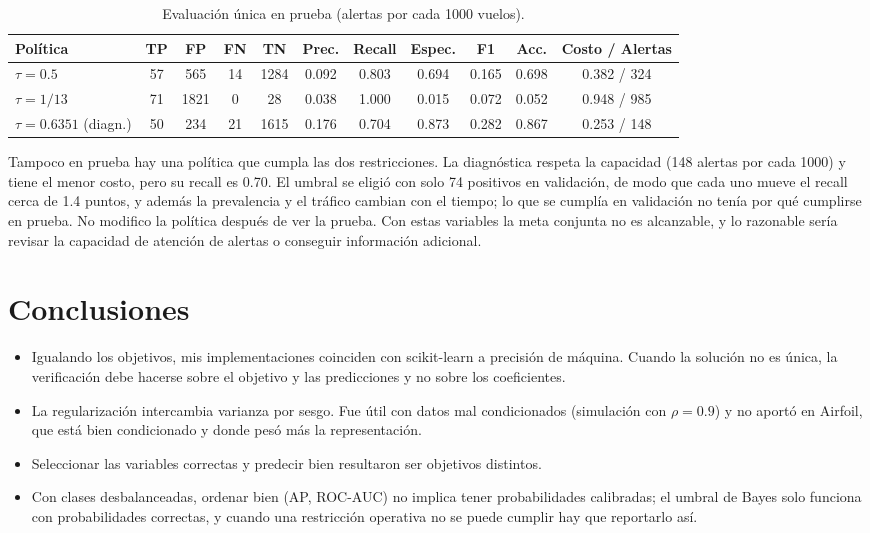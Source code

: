 \documentclass[10pt,a4paper]{article}
\begin{document}
\begin{table}[h]\centering\small
\caption{Evaluación única en prueba (alertas por cada 1000 vuelos).}\label{tab:p7}
\begin{tabular}{lcccccccccc}\toprule
Política & TP & FP & FN & TN & Prec. & Recall & Espec. & F1 & Acc. & Costo / Alertas\\\midrule
$\tau=0.5$ & 57 & 565 & 14 & 1284 & 0.092 & 0.803 & 0.694 & 0.165 & 0.698 & 0.382 / 324\\
$\tau=1/13$ & 71 & 1821 & 0 & 28 & 0.038 & 1.000 & 0.015 & 0.072 & 0.052 & 0.948 / 985\\
$\tau=0.6351$ (diagn.) & 50 & 234 & 21 & 1615 & 0.176 & 0.704 & 0.873 & 0.282 & 0.867 & 0.253 / 148\\\bottomrule
\end{tabular}\end{table}

Tampoco en prueba hay una política que cumpla las dos restricciones. La diagnóstica respeta la capacidad (148 alertas por cada 1000) y tiene el menor costo, pero su recall es 0.70. El umbral se eligió con solo 74 positivos en validación, de modo que cada uno mueve el recall cerca de 1.4 puntos, y además la prevalencia y el tráfico cambian con el tiempo; lo que se cumplía en validación no tenía por qué cumplirse en prueba. No modifico la política después de ver la prueba. Con estas variables la meta conjunta no es alcanzable, y lo razonable sería revisar la capacidad de atención de alertas o conseguir información adicional.

\section*{Conclusiones}
\begin{itemize}
\item Igualando los objetivos, mis implementaciones coinciden con scikit-learn a precisión de máquina. Cuando la solución no es única, la verificación debe hacerse sobre el objetivo y las predicciones y no sobre los coeficientes.
\item La regularización intercambia varianza por sesgo. Fue útil con datos mal condicionados (simulación con $\rho=0.9$) y no aportó en Airfoil, que está bien condicionado y donde pesó más la representación.
\item Seleccionar las variables correctas y predecir bien resultaron ser objetivos distintos.
\item Con clases desbalanceadas, ordenar bien (AP, ROC-AUC) no implica tener probabilidades calibradas; el umbral de Bayes solo funciona con probabilidades correctas, y cuando una restricción operativa no se puede cumplir hay que reportarlo así.
\end{itemize}
\end{document}
